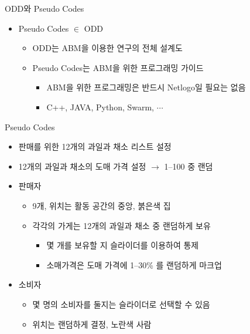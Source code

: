 \documentclass[hyperref={unicode}]{beamer}
\begin{document}
\begin{frame}{ODD와 Pseudo Codes}
\begin{itemize}
\item Pseudo Codes $\in$ ODD
	\begin{itemize}
	\item ODD는 ABM을 이용한 연구의 전체 설계도
	\item Pseudo Codes는 ABM을 위한 프로그래밍 가이드
		\begin{itemize}
		\item ABM을 위한 프로그래밍은 반드시 Netlogo일 필요는 없음
		\item C++, JAVA, Python, Swarm, $\cdots$
		\end{itemize}
	\end{itemize}
\end{itemize}	
\end{frame}

\begin{frame}{Pseudo Codes}
\begin{itemize}
\item 판매를 위한 12개의 과일과 채소 리스트 설정
\item 12개의 과일과 채소의 도매 가격 설정 $\rightarrow$ 1--100 중 랜덤
\item 판매자
	\begin{itemize}
	\item 9개, 위치는 활동 공간의 중앙, 붉은색 집 
	\item 각각의 가게는 12개의 과일과 채소 중 랜덤하게 보유 
		\begin{itemize}
		\item 몇 개를 보유할 지 슬라이더를 이용하여 통제
		\item 소매가격은 도매 가격에 1--30\% 를 랜덤하게 마크업
		\end{itemize}
	\end{itemize}
\item 소비자
	\begin{itemize}
	\item 몇 명의 소비자를 둘지는 슬라이더로 선택할 수 있음
	\item 위치는 랜덤하게 결정, 노란색 사람
	\end{itemize}	
\end{itemize}	
\end{frame}
\end{document}
